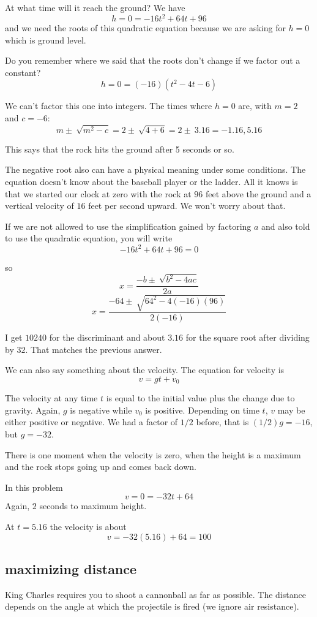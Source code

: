 \documentclass[11pt, oneside]{article}
\begin{document}
At what time will it reach the ground?  We have
\[ h = 0 = -16t^2 + 64t + 96 \]
and we need the roots of this quadratic equation because we are asking for $h = 0$ which is ground level.

Do you remember where we said that the roots don't change if we factor out a constant?
\[ h = 0 = (-16)(t^2 - 4t - 6) \]

We can't factor this one into integers.  The times where $h = 0$ are, with $m = 2$ and $c = -6$:
\[ m \pm \ \sqrt{m^2 - c} = 2 \pm \ \sqrt{4 + 6} = 2 \pm \ 3.16 = - 1.16, 5.16 \]

This says that the rock hits the ground after 5 seconds or so.  

The negative root also can have a physical meaning under some conditions.  The equation doesn't know about the baseball player or the ladder.  All it knows is that we started our clock at zero with the rock at $96$ feet above the ground and a vertical velocity of $16$ feet per second upward.  We won't worry about that.

If we are not allowed to use the simplification gained by factoring $a$ and also told to use the quadratic equation, you will write
\[ -16t^2 + 64t + 96 = 0 \]

so
\[ x = \frac{-b \pm \ \sqrt{b^2 - 4ac}}{2a} \]
\[ x = \frac{-64 \pm \ \sqrt{64^2 -4(-16)(96)}}{2(-16)} \]

I get $10240$ for the discriminant and about $3.16$ for the square root after dividing by $32$.  That matches the previous answer.

We can also say something about the velocity.  The equation for velocity is
\[ v = gt + v_0 \]

The velocity at any time $t$ is equal to the initial value plus the change due to gravity.  Again, $g$ is negative while $v_0$ is positive.  Depending on time $t$, $v$ may be either positive or negative.  We had a factor of $1/2$ before, that is $(1/2)g = -16$, but $g = -32$.

There is one moment when the velocity is zero, when the height is a maximum and the rock stops going up and comes back down.

In this problem
\[ v = 0 = -32t + 64 \]
Again, $2$ seconds to maximum height.

At $t = 5.16$ the velocity is about
\[ v = -32 (5.16) + 64 = 100 \]

\subsection*{maximizing distance}
King Charles requires you to shoot a cannonball as far as possible.  The distance depends on the angle at which the projectile is fired (we ignore air resistance).  
\end{document}
